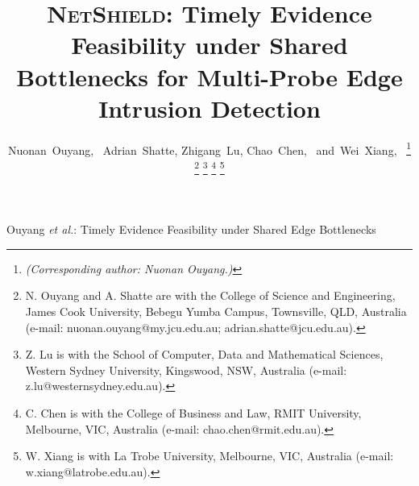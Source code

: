 \documentclass[10pt,journal]{IEEEtran}
\newcommand{\NetShield}{\textsc{NetShield}}
\begin{document}
\title{\NetShield: Timely Evidence Feasibility under Shared Bottlenecks
for Multi-Probe Edge Intrusion Detection}

\author{
Nuonan~Ouyang,~
Adrian~Shatte,
Zhigang~Lu,
Chao~Chen,~
and~Wei~Xiang,~%
\thanks{\textit{(Corresponding author: Nuonan Ouyang.)}}%
\thanks{N. Ouyang and A. Shatte are with the College of Science and
Engineering, James Cook University, Bebegu Yumba Campus, Townsville,
QLD, Australia
(e-mail: nuonan.ouyang@my.jcu.edu.au;
adrian.shatte@jcu.edu.au).}%
\thanks{Z. Lu is with the School of Computer, Data and Mathematical
Sciences, Western Sydney University, Kingswood, NSW, Australia
(e-mail: z.lu@westernsydney.edu.au).}%
\thanks{C. Chen is with the College of Business and Law,
RMIT University, Melbourne, VIC, Australia
(e-mail: chao.chen@rmit.edu.au).}%
\thanks{W. Xiang is with La Trobe University,
Melbourne, VIC, Australia
(e-mail: w.xiang@latrobe.edu.au).}%
}

%
{Ouyang \MakeLowercase{\textit{et al.}}:
Timely Evidence Feasibility under Shared Edge Bottlenecks}

\maketitle
\end{document}
